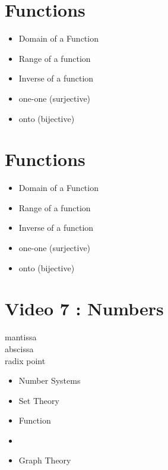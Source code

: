 \documentclass[]{report}
\begin{document}
\section*{Functions}
\begin{itemize}
\item Domain of a Function
\item Range of a function
\item Inverse of a function
\end{itemize}
\begin{itemize}
\item one-one (surjective)
\item onto (bijective)
\end{itemize}


\section*{Functions}
\begin{itemize}
\item Domain of a Function
\item Range of a function
\item Inverse of a function
\end{itemize}
\begin{itemize}
\item one-one (surjective)
\item onto (bijective)
\end{itemize}






\section{Video 7 : Numbers}


\begin{description}
\item[mantissa]
\item[abscissa]
\item[radix point]
\end{description}

\begin{itemize}
\item Number Systems
\item Set Theory
\item Function
\item 
\item Graph Theory
\end{itemize}
\end{document}
